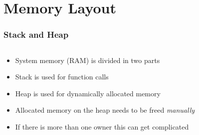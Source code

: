 \documentclass[usenames,dvipsnames,svgnames,table,aspectratio=169]{beamer}
\begin{document}
\section{Memory Layout}
\begin{frame}
    \frametitle{Stack and Heap}
    \begin{columns}
        \begin{column}{.5\textwidth}
            \begin{itemize}
                \item<+-> System memory (RAM) is divided in two parts
                \item<+-> Stack is used for function calls
                \item<+-> Heap is used for dynamically allocated memory
                \item<+-> Allocated memory on the heap needs to be freed \textit{manually}
                \item<+-> If there is more than one owner this can get complicated
            \end{itemize}
        \end{column}
        \begin{column}{.5\textwidth}
            \begin{figure}[H]
                \centering
            \end{figure}
        \end{column}
    \end{columns}
\end{frame}
\end{document}
